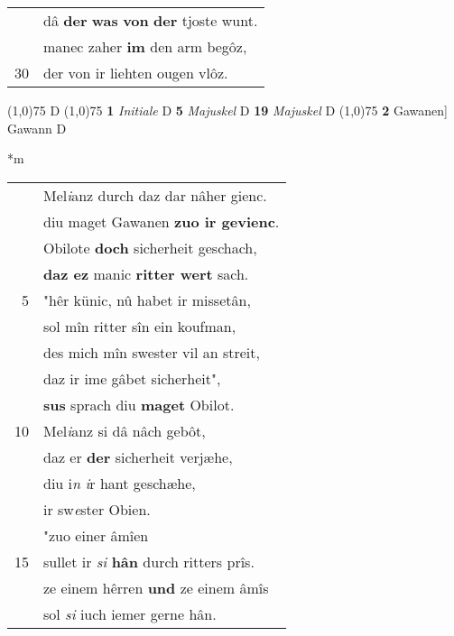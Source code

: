 \documentclass[8pt,a4paper,notitlepage]{article}
\begin{document}
\begin{table}[ht]
\begin{minipage}[t]{0.5\linewidth}
\begin{tabular}{rl}
 & dâ \textbf{der} \textbf{was} \textbf{von} \textbf{der} tjoste wunt.\\ 
 & manec zaher \textbf{im} den arm begôz,\\ 
30 & der von ir liehten ougen vlôz.\\ 
\end{tabular}
\scriptsize
\line(1,0){75} \newline
D \newline
\line(1,0){75} \newline
\textbf{1} \textit{Initiale} D  \textbf{5} \textit{Majuskel} D  \textbf{19} \textit{Majuskel} D  \newline
\line(1,0){75} \newline
\textbf{2} Gawanen] Gawann D \newline
\end{minipage}
\hspace{0.5cm}
\begin{minipage}[t]{0.5\linewidth}
\small
\begin{center}*m
\end{center}
\begin{tabular}{rl}
 & Mel\textit{i}anz durch daz dar nâher gienc.\\ 
 & diu maget Gawanen \textbf{zuo ir gevienc}.\\ 
 & Obilote \textbf{doch} sicherheit geschach,\\ 
 & \textbf{daz ez} manic \textbf{ritter wert} sach.\\ 
5 & "hêr künic, nû habet ir missetân,\\ 
 & sol mîn ritter sîn ein koufman,\\ 
 & des mich mîn swester vil an streit,\\ 
 & daz ir ime gâbet sicherheit",\\ 
 & \textbf{sus} sprach diu \textbf{maget} Obilot.\\ 
10 & Mel\textit{i}anz si dâ nâch gebôt,\\ 
 & daz er \textbf{der} sicherheit verjæhe,\\ 
 & diu i\textit{n} \textit{i}r hant geschæhe,\\ 
 & ir sw\textit{e}ster Obien.\\ 
 & "zuo einer âmîen\\ 
15 & sullet ir \textit{si} \textbf{hân} durch ritters prîs.\\ 
 & ze einem hêrren \textbf{und} ze einem âmîs\\ 
 & sol \textit{si} iuch iemer gerne hân.\\ 

\end{tabular}
\end{minipage}
\end{table}
\end{document}
